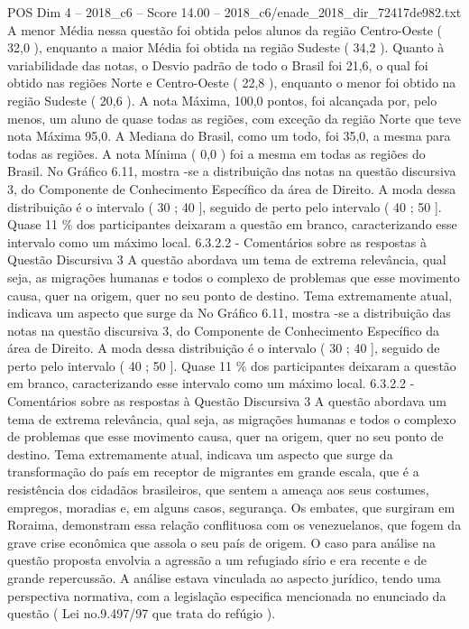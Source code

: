 \begin{textsample}{POS Dim 4 – 2018\_c6 – Score 14.00 – 2018\_c6/enade\_2018\_dir\_72417de982.txt}
A menor Média nessa questão foi obtida pelos alunos da região Centro-Oeste ( 32,0 ), enquanto a maior Média foi obtida na região Sudeste ( 34,2 ).
Quanto à variabilidade das notas, o Desvio padrão de todo o Brasil foi 21,6, o qual foi obtido nas regiões Norte e Centro-Oeste ( 22,8 ), enquanto o menor foi obtido na região Sudeste ( 20,6 ).
A nota Máxima, 100,0 pontos, foi alcançada por, pelo menos, um aluno de quase todas as regiões, com exceção da região Norte que teve nota Máxima 95,0.
A Mediana do Brasil, como um todo, foi 35,0, a mesma para todas as regiões.
A nota Mínima ( 0,0 ) foi a mesma em todas as regiões do Brasil.
No Gráfico 6.11, mostra -se a distribuição das notas na questão discursiva 3, do Componente de Conhecimento Específico da área de Direito.
A moda dessa distribuição é o intervalo ( 30 ; 40 ], seguido de perto pelo intervalo ( 40 ; 50 ].
Quase 11 \% dos participantes deixaram a questão em branco, caracterizando esse intervalo como um máximo local. 6.3.2.2 - Comentários sobre as respostas à Questão Discursiva 3 A questão abordava um tema de extrema relevância, qual seja, as migrações humanas e todos o complexo de problemas que esse movimento causa, quer na origem, quer no seu ponto de destino.
Tema extremamente atual, indicava um aspecto que surge da No Gráfico 6.11, mostra -se a distribuição das notas na questão discursiva 3, do Componente de Conhecimento Específico da área de Direito.
A moda dessa distribuição é o intervalo ( 30 ; 40 ], seguido de perto pelo intervalo ( 40 ; 50 ].
Quase 11 \% dos participantes deixaram a questão em branco, caracterizando esse intervalo como um máximo local. 6.3.2.2 - Comentários sobre as respostas à Questão Discursiva 3 A questão abordava um tema de extrema relevância, qual seja, as migrações humanas e todos o complexo de problemas que esse movimento causa, quer na origem, quer no seu ponto de destino.
Tema extremamente atual, indicava um aspecto que surge da transformação do país em receptor de migrantes em grande escala, que é a resistência dos cidadãos brasileiros, que sentem a ameaça aos seus costumes, empregos, moradias e, em alguns casos, segurança.
Os embates, que surgiram em Roraima, demonstram essa relação conflituosa com os venezuelanos, que fogem da grave crise econômica que assola o seu país de origem.
O caso para análise na questão proposta envolvia a agressão a um refugiado sírio e era recente e de grande repercussão.
A análise estava vinculada ao aspecto jurídico, tendo uma perspectiva normativa, com a legislação especifica mencionada no enunciado da questão ( Lei no.9.497/97 que trata do refúgio ).

\end{textsample}
